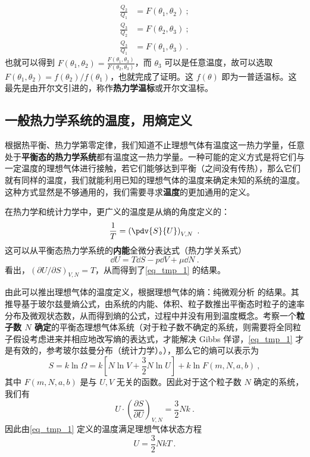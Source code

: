 \begin{equation}
\begin{aligned}
\frac{Q_2}{Q_1} &= F(\theta_1, \theta_2)~;\\
\frac{Q_3}{Q_2} &= F(\theta_2, \theta_3)~;\\
\frac{Q_3}{Q_1} &= F(\theta_1, \theta_3)~.
\end{aligned}
\end{equation}
也就可以得到 $F(\theta_1, \theta_2) = \frac{F(\theta_1, \theta_3)}{F(\theta_2, \theta_3)}$，而 $\theta_3$ 可以是任意温度，故可以选取 $F(\theta_1, \theta_2) = f(\theta_2)/f(\theta_1)$，也就完成了证明。这 $f(\theta)$ 即为一普适温标。这最先是由开尔文引进的，称作\textbf{热力学温标}或开尔文温标。

\subsection{一般热力学系统的温度，用熵定义}
根据热平衡、热力学第零定律，我们知道不止理想气体有温度这一热力学量，任意处于\textbf{平衡态的热力学系统}都有温度这一热力学量。一种可能的定义方式是将它们与一定温度的理想气体进行接触，若它们能够达到平衡（之间没有传热），那么它们就有同样的温度，我们就能利用已知的理想气体的温度来确定未知的系统的温度。这种方式显然是不够通用的，我们需要寻求\textbf{温度}的更加通用的定义。

在热力学和统计力学中，更广义的温度是从熵的角度定义的：
\begin{equation}\label{eq_tmp_1}
\frac{1}{T} = \left(\pdv{S}{U}\right)_{V,N} ~.
\end{equation}
这可以从平衡态热力学系统的\textbf{内能}全微分表达式（热力学关系式）
\begin{equation}
\dd U=T\dd S-p\dd V+\mu \dd N~.
\end{equation}
看出，$(\partial U/\partial S)_{V,N}=T$，从而得到了\autoref{eq_tmp_1} 的结果。

由此可以推出理想气体的温度定义，根据理想气体的熵：纯微观分析 的结果。其推导基于玻尔兹曼熵公式，由系统的内能、体积、粒子数推出平衡态时粒子的速率分布及微观状态数，从而得到熵的公式，过程中并没有用到温度概念。考察一个\textbf{粒子数 $N$ 确定}的平衡态理想气体系统（对于粒子数不确定的系统，则需要将全同粒子假设考虑进来并相应地改写熵的表达式，才能解决 Gibbs 佯谬，\autoref{eq_tmp_1} 才是有效的，参考玻尔兹曼分布（统计力学）。），那么它的熵可以表示为
\begin{equation}
S=k\ln \Omega =k\left[ N\ln V+\frac{3}{2}N\ln U \right] +k\ln F\left( m,N,a,b \right) ~,
\end{equation}
其中 $F(m,N,a,b)$ 是与 $U,V$ 无关的函数。因此对于这个粒子数 $N$ 确定的系统，我们有
\begin{equation}
U\cdot \left(\frac{\partial S}{\partial U}\right)_{V,N}=\frac{3}{2}Nk~.
\end{equation}
因此由\autoref{eq_tmp_1} 定义的温度满足理想气体状态方程
\begin{equation}
U=\frac{3}{2}NkT~.
\end{equation}

